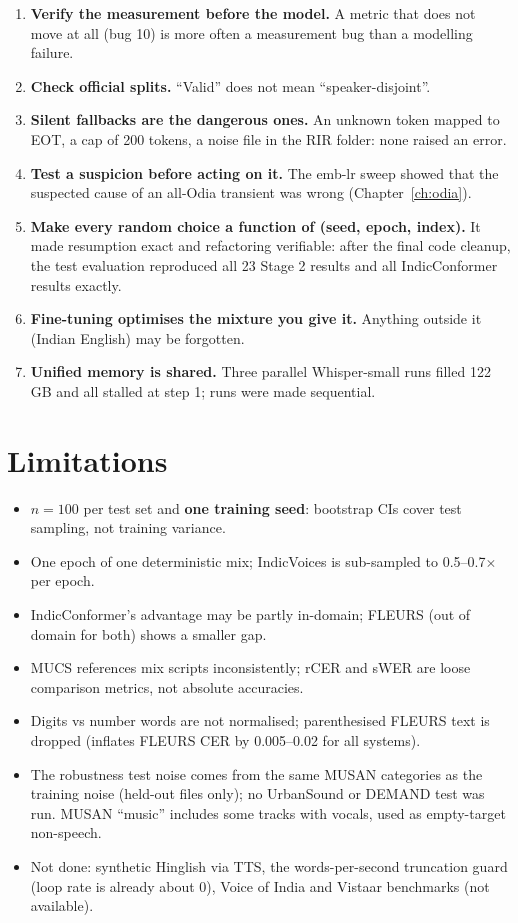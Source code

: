 \begin{enumerate}
\item \textbf{Verify the measurement before the model.} A metric that does not move at all (bug 10) is more often a measurement bug
than a modelling failure.
\item \textbf{Check official splits.} ``Valid'' does not mean ``speaker-disjoint''.
\item \textbf{Silent fallbacks are the dangerous ones.} An unknown token mapped to EOT, a cap of 200 tokens, a noise file in the RIR
folder: none raised an error.
\item \textbf{Test a suspicion before acting on it.} The emb-lr sweep showed that the suspected cause of an all-Odia transient was
wrong (Chapter~\ref{ch:odia}).
\item \textbf{Make every random choice a function of (seed, epoch, index).} It made resumption exact and refactoring verifiable:
after the final code cleanup, the test evaluation reproduced all 23 Stage 2 results and all IndicConformer results exactly.
\item \textbf{Fine-tuning optimises the mixture you give it.} Anything outside it (Indian English) may be forgotten.
\item \textbf{Unified memory is shared.} Three parallel Whisper-small runs filled 122 GB and all stalled at step 1; runs were made
sequential.
\end{enumerate}

\section{Limitations}

\begin{itemize}
\item $n=100$ per test set and \textbf{one training seed}: bootstrap CIs cover test sampling, not training variance.
\item One epoch of one deterministic mix; IndicVoices is sub-sampled to 0.5--0.7$\times$ per epoch.
\item IndicConformer's advantage may be partly in-domain; FLEURS (out of domain for both) shows a smaller gap.
\item MUCS references mix scripts inconsistently; rCER and sWER are loose comparison metrics, not absolute accuracies.
\item Digits vs number words are not normalised; parenthesised FLEURS text is dropped (inflates FLEURS CER by 0.005--0.02 for all
systems).
\item The robustness test noise comes from the same MUSAN categories as the training noise (held-out files only); no UrbanSound or
DEMAND test was run. MUSAN ``music'' includes some tracks with vocals, used as empty-target non-speech.
\item Not done: synthetic Hinglish via TTS, the words-per-second truncation guard (loop rate is already about 0), Voice of India and
Vistaar benchmarks (not available).
\end{itemize}

